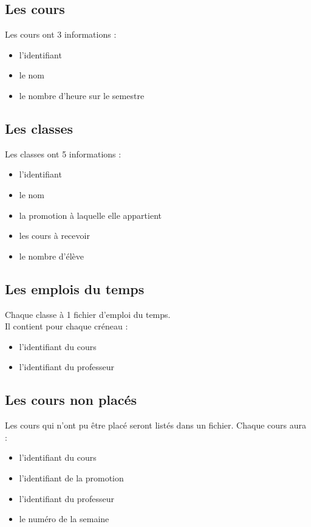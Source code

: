 \documentclass{beamer}
\begin{document}
\subsection{Les cours}
\begin{frame}
Les cours ont 3 informations : 
\begin{itemize}
\item l'identifiant
\item le nom
\item le nombre d'heure sur le semestre
\end{itemize}
\end{frame}

\subsection{Les classes}
\begin{frame}
Les classes ont 5 informations : 
\begin{itemize}
\item l'identifiant
\item le nom
\item la promotion à laquelle elle appartient
\item les cours à recevoir
\item le nombre d'élève
\end{itemize}
\end{frame}

\subsection{Les emplois du temps}
\begin {frame}
Chaque classe à 1 fichier d'emploi du temps.\\
Il contient pour chaque créneau : 
\begin {itemize}
\item l'identifiant du cours
\item l'identifiant du professeur
\end{itemize}
\end{frame}

\subsection{Les cours non placés}
\begin{frame}
Les cours qui n'ont pu être placé seront listés dans un fichier.
Chaque cours aura : 
\begin{itemize}
\item l'identifiant du cours
\item l'identifiant de la promotion
\item l'identifiant du professeur
\item le numéro de la semaine
\end{itemize}
\end{frame}
\end{document}
